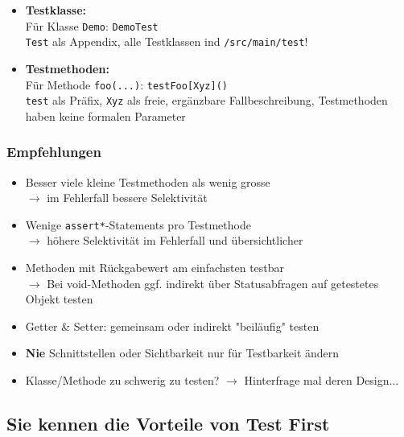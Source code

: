 \documentclass[a4paper]{article}
\begin{document}
				\begin{itemize}
					\item \textbf{Testklasse:}\\
						Für Klasse \texttt{Demo}: \texttt{DemoTest}\\
						\texttt{Test} als Appendix, alle Testklassen ind \texttt{/src/main/test}!
					
					\item \textbf{Testmethoden:}\\
						Für Methode \texttt{foo(...)}: \texttt{testFoo[Xyz]()}\\
						\texttt{test} als Präfix, \texttt{Xyz} als freie, ergänzbare Fallbeschreibung, Testmethoden haben keine formalen Parameter
				\end{itemize}
			
			\subsubsection{Empfehlungen}
			
			\begin{itemize}
				\item Besser viele kleine Testmethoden als wenig grosse \\
				$\rightarrow$ im Fehlerfall bessere Selektivität
				
				\item Wenige \texttt{assert*}-Statements pro Testmethode \\
				$\rightarrow$ höhere Selektivität im Fehlerfall und übersichtlicher
				
				\item Methoden mit Rückgabewert am einfachsten testbar\\
				$\rightarrow$ Bei void-Methoden ggf. indirekt über Statusabfragen auf getestetes Objekt testen
				
				\item Getter \& Setter: gemeinsam oder indirekt "beiläufig" testen
				
				\item \textbf{Nie} Schnittstellen oder Sichtbarkeit nur für Testbarkeit ändern
				
				\item Klasse/Methode zu schwerig zu testen? $\rightarrow$ Hinterfrage mal deren Design...
			\end{itemize}
			
		\subsection{Sie kennen die Vorteile von Test First}
		
\end{document}
